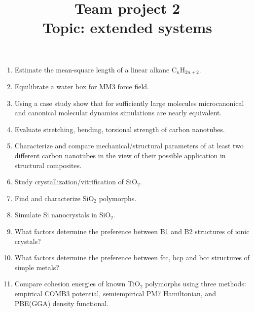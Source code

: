 \documentclass{Project}
\begin{document}
\title{Team project 2\\ Topic: extended systems}
\maketitle

\preface{}

\begin{enumerate}
\item Estimate the mean-square length of a linear alkane C$_n$H$_{2n+2}$.
\item Equilibrate a water box for MM3 force field.
\item Using a case study show that for sufficiently large molecules microcanonical and canonical molecular dynamics simulations are nearly equivalent.
\item Evaluate stretching, bending, torsional strength of carbon nanotubes.
\item Characterize and compare mechanical/structural parameters of at least
two different carbon nanotubes in the view of their possible application in structural composites.
\item Study crystallization/vitrification of SiO$_2$.
\item Find and characterize SiO$_2$ polymorphs.
\item Simulate Si nanocrystals in SiO$_2$.
\item What factors determine the preference between B1 and B2 structures of ionic crystals?
\item What factors determine the preference between fcc, hcp and bcc structures of simple metals?
\item Compare cohesion energies of known TiO$_2$ polymorphs using three methods: empirical COMB3 potential, semiempirical PM7 Hamiltonian, and PBE(GGA) density functional.
\end{enumerate}

\reminder{}
\end{document}
